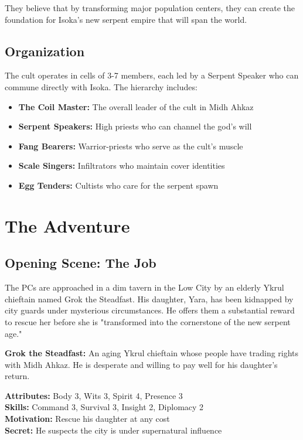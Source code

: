 \documentclass[12pt,twoside]{article}
\begin{document}
They believe that by transforming major population centers, they can create the foundation for Isoka's new serpent empire that will span the world.

\subsection{Organization}

The cult operates in cells of 3-7 members, each led by a Serpent Speaker who can commune directly with Isoka. The hierarchy includes:
\begin{itemize}
  \item \textbf{The Coil Master:} The overall leader of the cult in Midh Ahkaz
  \item \textbf{Serpent Speakers:} High priests who can channel the god's will
  \item \textbf{Fang Bearers:} Warrior-priests who serve as the cult's muscle
  \item \textbf{Scale Singers:} Infiltrators who maintain cover identities
  \item \textbf{Egg Tenders:} Cultists who care for the serpent spawn
\end{itemize}

\section{The Adventure}

\subsection{Opening Scene: The Job}

The PCs are approached in a dim tavern in the Low City by an elderly Ykrul chieftain named Grok the Steadfast. His daughter, Yara, has been kidnapped by city guards under mysterious circumstances. He offers them a substantial reward to rescue her before she is "transformed into the cornerstone of the new serpent age."

\textbf{Grok the Steadfast:}
An aging Ykrul chieftain whose people have trading rights with Midh Ahkaz. He is desperate and willing to pay well for his daughter's return.

\textbf{Attributes:} Body 3, Wits 3, Spirit 4, Presence 3 \\
\textbf{Skills:} Command 3, Survival 3, Insight 2, Diplomacy 2 \\
\textbf{Motivation:} Rescue his daughter at any cost \\
\textbf{Secret:} He suspects the city is under supernatural influence
\end{document}
